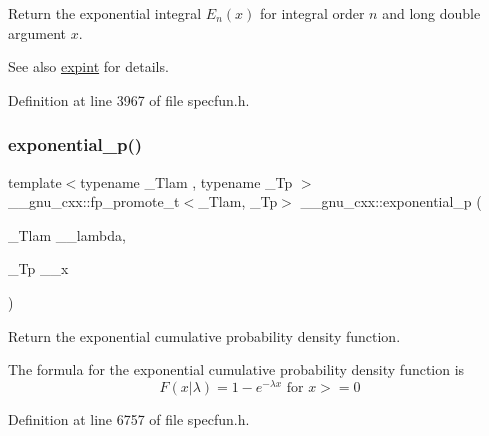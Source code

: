 Return the exponential integral $ E_n(x) $ for integral order $ n $ and {\ttfamily long double} argument $ x $.

\begin{DoxySeeAlso}{See also}
\hyperlink{group__gnu__math__spec__func_gadaf9317953b826975da72d1858f01ea5}{expint} for details. 
\end{DoxySeeAlso}


Definition at line 3967 of file specfun.\+h.

\mbox{\label{group__gnu__math__spec__func_gaa546f47f8ab943d2c10b56bec8a44079}} 
\subsubsection{\texorpdfstring{exponential\+\_\+p()}{exponential\_p()}}
{\footnotesize\ttfamily template$<$typename \+\_\+\+Tlam , typename \+\_\+\+Tp $>$ \\
\+\_\+\+\_\+gnu\+\_\+cxx\+::fp\+\_\+promote\+\_\+t$<$\+\_\+\+Tlam, \+\_\+\+Tp$>$ \+\_\+\+\_\+gnu\+\_\+cxx\+::exponential\+\_\+p (\begin{DoxyParamCaption}\item[{\+\_\+\+Tlam}]{\+\_\+\+\_\+lambda,  }\item[{\+\_\+\+Tp}]{\+\_\+\+\_\+x }\end{DoxyParamCaption})\hspace{0.3cm}{\ttfamily [inline]}}



Return the exponential cumulative probability density function. 

The formula for the exponential cumulative probability density function is \[ F(x|\lambda) = 1 - e^{-\lambda x} \mbox{ for } x >= 0 \] 

Definition at line 6757 of file specfun.\+h.

\mbox{\label{group__gnu__math__spec__func_ga7f35499a94fd8930810809988332161e}} 
